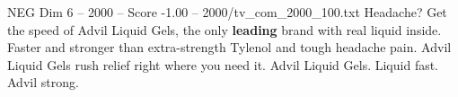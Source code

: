 \begin{textsample}{NEG Dim 6 – 2000 – Score -1.00 – 2000/tv\_com\_2000\_100.txt}  \label{ex:f6_neg_013}
Headache?
Get the speed of Advil Liquid Gels, the only \textbf{leading} brand with real liquid inside.
Faster and stronger than extra-strength Tylenol and tough headache pain.
Advil Liquid Gels rush relief right where you need it.
Advil Liquid Gels.
Liquid fast.
Advil strong.

\end{textsample}
